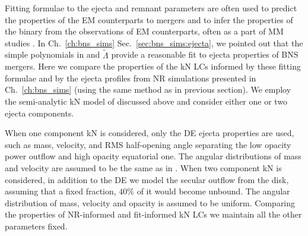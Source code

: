
Fitting formulae to the ejecta and remnant parameters are often used to predict the 
properties of the \ac{EM} counterparts to mergers and to infer the properties of the 
binary from the observations of \ac{EM} counterparts, often as a part of \ac{MM} studies 
\citep{Dietrich:2020efo,Breschi:2021tbm,Nicholl:2021rcr,Dietrich:2020efo}.
%
In Ch.~\ref{ch:bns_sims} Sec.~\ref{sec:bns_sims:ejecta}, we pointed out that the 
simple polynomials in \mr{} and $\tilde{\Lambda}$ provide a reasonable fit to 
ejecta properties of \ac{BNS} mergers. 
%
%
%
%
Here we compare the properties of the \ac{kN} \acp{LC} informed by these fitting 
formulae and by the ejecta profiles from \ac{NR} simulations presented in 
Ch.~\ref{ch:bns_sims} (using the same method as in previous section). %
We employ the semi-analytic \ac{kN} model of \citet{Perego:2017wtu} discussed 
above and consider either one or two ejecta components.

When one component \ac{kN} is considered, only the \ac{DE} ejecta properties are used, 
such as mass, velocity, and \ac{RMS} half-opening angle separating the low opacity 
power outflow and high opacity equatorial one. The angular distributions of mass and velocity 
are assumed to be the same as in \citet{Perego:2017wtu}.
When two component \ac{kN} is considered, in addition to the \ac{DE} we model the 
secular outflow from the disk, assuming that a fixed fraction, $40\%$ of it would 
become unbound. The angular distribution of mass, velocity and opacity
is assumed to be uniform. 
Comparing the properties of \ac{NR}-informed and fit-informed \ac{kN} \acp{LC} we 
maintain all the other parameters fixed.
%

